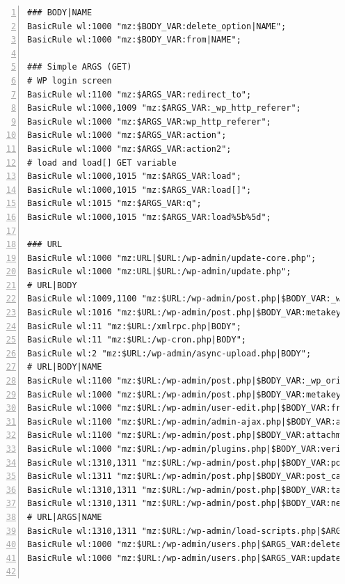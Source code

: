 \documentclass[Measurement results]{subfiles}
\begin{document}
\begin{lstlisting}[frame=single,caption=/etc/nginx/nbs.rules,backgroundcolor=\color{gray},breaklines=true,numbers=left,]
### BODY|NAME
BasicRule wl:1000 "mz:$BODY_VAR:delete_option|NAME";
BasicRule wl:1000 "mz:$BODY_VAR:from|NAME";

### Simple ARGS (GET)
# WP login screen
BasicRule wl:1100 "mz:$ARGS_VAR:redirect_to";
BasicRule wl:1000,1009 "mz:$ARGS_VAR:_wp_http_referer";
BasicRule wl:1000 "mz:$ARGS_VAR:wp_http_referer";
BasicRule wl:1000 "mz:$ARGS_VAR:action";
BasicRule wl:1000 "mz:$ARGS_VAR:action2";
# load and load[] GET variable
BasicRule wl:1000,1015 "mz:$ARGS_VAR:load";
BasicRule wl:1000,1015 "mz:$ARGS_VAR:load[]";
BasicRule wl:1015 "mz:$ARGS_VAR:q";
BasicRule wl:1000,1015 "mz:$ARGS_VAR:load%5b%5d";

### URL
BasicRule wl:1000 "mz:URL|$URL:/wp-admin/update-core.php";
BasicRule wl:1000 "mz:URL|$URL:/wp-admin/update.php";
# URL|BODY
BasicRule wl:1009,1100 "mz:$URL:/wp-admin/post.php|$BODY_VAR:_wp_http_referer";
BasicRule wl:1016 "mz:$URL:/wp-admin/post.php|$BODY_VAR:metakeyselect";
BasicRule wl:11 "mz:$URL:/xmlrpc.php|BODY";
BasicRule wl:11 "mz:$URL:/wp-cron.php|BODY";
BasicRule wl:2 "mz:$URL:/wp-admin/async-upload.php|BODY";
# URL|BODY|NAME
BasicRule wl:1100 "mz:$URL:/wp-admin/post.php|$BODY_VAR:_wp_original_http_referer|NAME";
BasicRule wl:1000 "mz:$URL:/wp-admin/post.php|$BODY_VAR:metakeyselect|NAME";
BasicRule wl:1000 "mz:$URL:/wp-admin/user-edit.php|$BODY_VAR:from|NAME";
BasicRule wl:1100 "mz:$URL:/wp-admin/admin-ajax.php|$BODY_VAR:attachment%5burl%5d|NAME";
BasicRule wl:1100 "mz:$URL:/wp-admin/post.php|$BODY_VAR:attachment_url|NAME";
BasicRule wl:1000 "mz:$URL:/wp-admin/plugins.php|$BODY_VAR:verify-delete|NAME";
BasicRule wl:1310,1311 "mz:$URL:/wp-admin/post.php|$BODY_VAR:post_category[]|NAME";
BasicRule wl:1311 "mz:$URL:/wp-admin/post.php|$BODY_VAR:post_category|NAME";
BasicRule wl:1310,1311 "mz:$URL:/wp-admin/post.php|$BODY_VAR:tax_input[post_tag]|NAME";
BasicRule wl:1310,1311 "mz:$URL:/wp-admin/post.php|$BODY_VAR:newtag[post_tag]|NAME";
# URL|ARGS|NAME
BasicRule wl:1310,1311 "mz:$URL:/wp-admin/load-scripts.php|$ARGS_VAR:load[]|NAME";
BasicRule wl:1000 "mz:$URL:/wp-admin/users.php|$ARGS_VAR:delete_count|NAME";
BasicRule wl:1000 "mz:$URL:/wp-admin/users.php|$ARGS_VAR:update|NAME";


\end{lstlisting}
\end{document}
